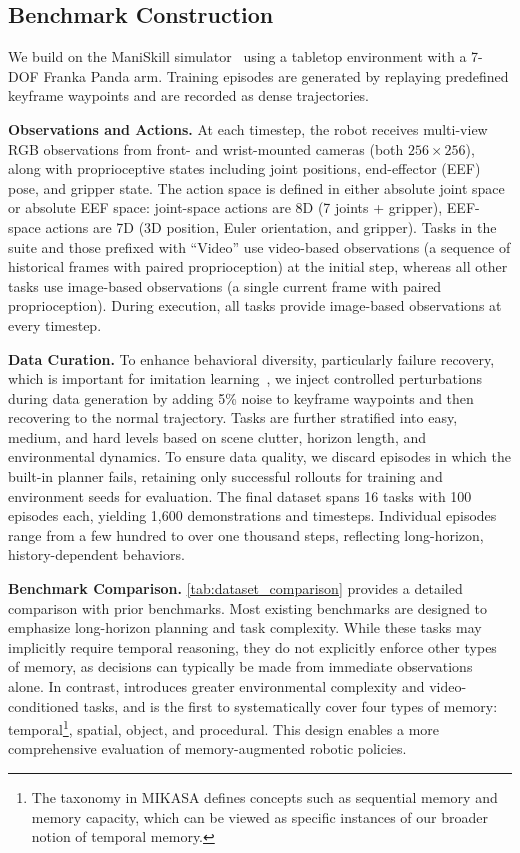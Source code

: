 \subsection{Benchmark Construction}

We build on the ManiSkill simulator~\cite{mu2021maniskill} using a tabletop environment with a 7-DOF Franka Panda arm.
Training episodes are generated by replaying predefined keyframe waypoints and are recorded as dense trajectories.


\noindent\textbf{Observations and Actions.}
At each timestep, the robot receives multi-view RGB observations from front- and wrist-mounted cameras (both $256 \times 256$), along with proprioceptive states including joint positions, end-effector (EEF) pose, and gripper state. The action space is defined in either absolute joint space or absolute EEF space: joint-space actions are 8D (7 joints + gripper), EEF-space actions are 7D (3D position, Euler orientation, and gripper).
Tasks in the \TSfour\xspace suite and those prefixed with ``Video'' use video-based observations (a sequence of historical frames with paired proprioception) at the initial step, whereas all other tasks use image-based observations (a single current frame with paired proprioception). During execution, all tasks provide image-based observations at every timestep.

\noindent\textbf{Data Curation.}
To enhance behavioral diversity, particularly failure recovery, which is important for imitation learning~\cite{dai2025racer}, we inject controlled perturbations during data generation by adding 5\% noise to keyframe waypoints and then recovering to the normal  trajectory. Tasks are further stratified into easy, medium, and hard levels based on scene clutter, horizon length, and environmental dynamics. To ensure data quality, we discard episodes in which the built-in planner fails, retaining only successful rollouts for training and environment seeds for evaluation. The final dataset spans 16 tasks with 100 episodes each, yielding 1,600 demonstrations and \trainsteps\xspace  timesteps. Individual episodes range from a few hundred to over one thousand steps, reflecting long-horizon, history-dependent behaviors.

\noindent\textbf{Benchmark Comparison.}
\cref{tab:dataset_comparison} provides a detailed comparison with prior benchmarks. Most existing benchmarks \cite{han2025robocerebra, zhang2025vlabench, mees2022calvin} are designed to emphasize long-horizon planning and task complexity. While these tasks may implicitly require temporal reasoning, they do not explicitly enforce other types of memory, as decisions can typically be made from immediate observations alone.
In contrast, \benchname\xspace introduces greater environmental complexity and video-conditioned tasks, and is the first to systematically cover four types of memory: temporal\footnote{The taxonomy in MIKASA \cite{cherepanov2025memory} defines concepts such as sequential memory and memory capacity, which can be viewed as specific instances of our broader notion of temporal memory.}, spatial, object, and procedural. This design enables a more comprehensive evaluation of memory-augmented robotic policies.

